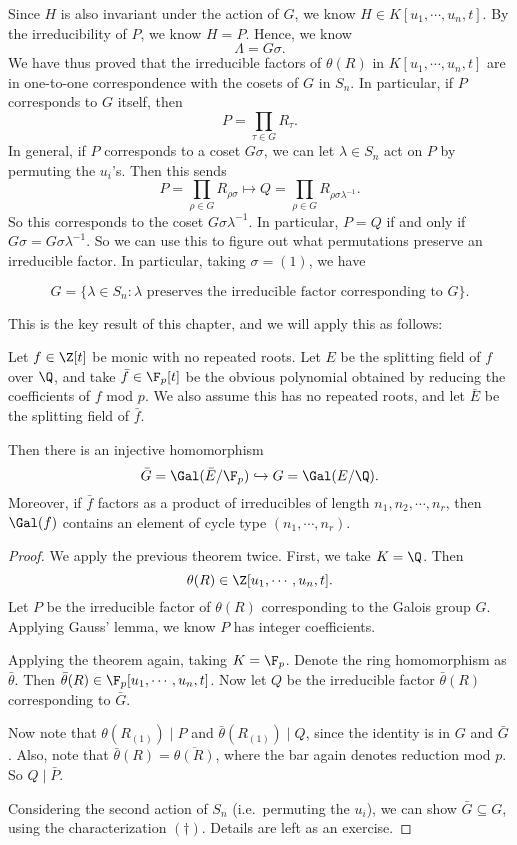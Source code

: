 \documentclass[a4paper]{article}
\begin{document}
Since $H$ is also invariant under the action of $G$, we know $H \in K[u_1, \cdots, u_n, t]$. By the irreducibility of $P$, we know $H = P$. Hence, we know
\[
  \Lambda = G\sigma.
\]
We have thus proved that the irreducible factors of $\theta(R)$ in $K[u_1, \cdots, u_n, t] $ are in one-to-one correspondence with the cosets of $G$ in $S_n$. In particular, if $P$ corresponds to $G$ itself, then
\[
  P = \prod_{\tau \in G} R_\tau.
\]
In general, if $P$ corresponds to a coset $G \sigma$, we can let $\lambda \in S_n$ act on $P$ by permuting the $u_i$'s. Then this sends
\[
  P = \prod_{\rho \in G} R_{\rho \sigma} \mapsto Q = \prod_{\rho \in G} R_{\rho \sigma \lambda^{-1}}.
\]
So this corresponds to the coset $G\sigma\lambda^{-1}$. In particular, $P = Q$ if and only if $G\sigma = G \sigma \lambda^{-1}$. So we can use this to figure out what permutations preserve an irreducible factor. In particular, taking $\sigma = (1)$, we have
\begin{thm}
  \[
    G = \{\lambda \in S_n : \lambda \text{ preserves the irreducible factor corresponding to }G\}.\tag{$\dagger$}
  \]
\end{thm}
This is the key result of this chapter, and we will apply this as follows:

\begin{thm}
  Let $f \in \Z[t]$ be monic with no repeated roots. Let $E$ be the splitting field of $f$ over $\Q$, and take $\bar{f} \in \F_p[t]$ be the obvious polynomial obtained by reducing the coefficients of $f$ mod $p$. We also assume this has no repeated roots, and let $\bar{E}$ be the splitting field of $\bar{f}$.

  Then there is an injective homomorphism
  \[
    \bar{G} = \Gal(\bar{E}/\F_p) \hookrightarrow G = \Gal(E/\Q).
  \]
  Moreover, if $\bar{f}$ factors as a product of irreducibles of length $n_1, n_2, \cdots, n_r$, then $\Gal(f)$ contains an element of cycle type $(n_1, \cdots, n_r)$.
\end{thm}

\begin{proof}
  We apply the previous theorem twice. First, we take $K = \Q$. Then
  \[
    \theta(R) \in \Z[u_1, \cdots, u_n, t].
  \]
  Let $P$ be the irreducible factor of $\theta(R)$ corresponding to the Galois group $G$. Applying Gauss' lemma, we know $P$ has integer coefficients.

  Applying the theorem again, taking $K = \F_p$. Denote the ring homomorphism as $\bar{\theta}$. Then $\bar{\theta}(R) \in \F_p[u_1, \cdots, u_n, t]$. Now let $Q$ be the irreducible factor $\bar{\theta}(R)$ corresponding to $\bar{G}$.

  Now note that $\theta(R_{(1)}) \mid P$ and $\bar{\theta}(R_{(1)}) \mid Q$, since the identity is in $G$ and $\bar{G}$. Also, note that $\bar{\theta}(R) = \overline{\theta(R)}$, where the bar again denotes reduction mod $p$. So $Q \mid \bar{P}$.

  Considering the second action of $S_n$ (i.e.\ permuting the $u_i$), we can show $\bar{G} \subseteq G$, using the characterization $(\dagger)$. Details are left as an exercise.
\end{proof}
\end{document}
